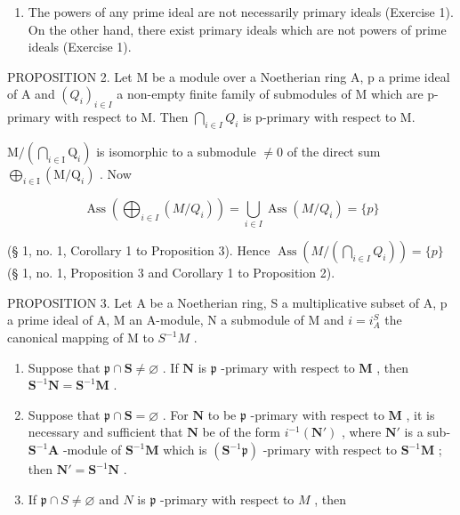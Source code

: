 

\begin{enumerate}
\def\labelenumi{(\arabic{enumi})}
\setcounter{enumi}{4}
\tightlist
\item
  The powers of any prime ideal are not necessarily primary ideals (Exercise 1). On the other hand, there exist primary ideals which are not powers of prime ideals (Exercise 1).
\end{enumerate}

PROPOSITION 2. Let M be a module over a Noetherian ring A, p a prime ideal of A and \((Q_{i})_{i\in I}\) a non-empty finite family of submodules of M which are p-primary with respect to M. Then \(\bigcap_{i\in I} Q_{i}\) is p-primary with respect to M.

\(\mathrm{M}/\left(\bigcap_{i\in\mathrm{I}}\mathrm{Q}_{i}\right)\) is isomorphic to a submodule \(\neq0\) of the direct sum \(\bigoplus_{i\in\mathrm{I}}(\mathrm{M}/\mathrm{Q}_{i})\) . Now

\[
\operatorname{Ass} \left(\bigoplus_ {i \in I} (M / Q _ {i})\right) = \bigcup_ {i \in I} \operatorname{Ass} (M / Q _ {i}) = \{p \}
\]

(§ 1, no. 1, Corollary 1 to Proposition 3). Hence \(\operatorname{Ass}\left(M / \left(\bigcap_{i \in I} Q_i\right)\right) = \{p\}\) (§ 1, no. 1, Proposition 3 and Corollary 1 to Proposition 2).

PROPOSITION 3. Let A be a Noetherian ring, S a multiplicative subset of A, p a prime ideal of A, M an A-module, N a submodule of M and \(i = i_{A}^{S}\) the canonical mapping of M to \(S^{-1}M\) .

\begin{enumerate}
\def\labelenumi{(\roman{enumi})}
\item
  Suppose that \(\mathfrak{p} \cap \mathbf{S} \neq \varnothing\) . If \(\mathbf{N}\) is \(\mathfrak{p}\) -primary with respect to \(\mathbf{M}\) , then \(\mathbf{S}^{-1}\mathbf{N} = \mathbf{S}^{-1}\mathbf{M}\) .
\item
  Suppose that \(\mathfrak{p} \cap \mathbf{S} = \varnothing\) . For \(\mathbf{N}\) to be \(\mathfrak{p}\) -primary with respect to \(\mathbf{M}\) , it is necessary and sufficient that \(\mathbf{N}\) be of the form \(i^{-1}(\mathbf{N}')\) , where \(\mathbf{N}'\) is a sub- \(\mathbf{S}^{-1}\mathbf{A}\) -module of \(\mathbf{S}^{-1}\mathbf{M}\) which is \((\mathbf{S}^{-1}\mathfrak{p})\) -primary with respect to \(\mathbf{S}^{-1}\mathbf{M}\) ; then \(\mathbf{N}' = \mathbf{S}^{-1}\mathbf{N}\) .
\item
  If \(\mathfrak{p} \cap S \neq \varnothing\) and \(N\) is \(\mathfrak{p}\) -primary with respect to \(M\) , then
\end{enumerate}

